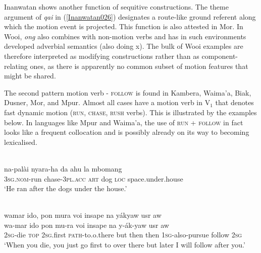 Inanwatan shows another function of sequitive constructions. The theme argument of \textit{qai} in (\ref{Inanwatan026}) designates a route-like ground referent along which the motion event is projected. This function is also attested in Mor. In Wooi, \textit{ong} also combines with non-motion verbs and has in such environments developed adverbial semantics (also doing x). The bulk of Wooi examples are therefore interpreted as modifying constructions rather than as component-relating ones, as there is apparently no common subset of motion features that might be shared.

The second pattern motion verb - \textsc{follow} is found in Kambera, Waima'a, Biak, Dusner, Mor, and Mpur. Almost all cases have a motion verb in V$_{1}$ that denotes fast dynamic motion (\textsc{run}, \textsc{chase}, \textsc{rush} verbs). This is illustrated by the examples below. In languages like Mpur and Waima'a, the use of \textsc{run} + \textsc{follow} in fact looks like a frequent collocation and is possibly already on its way to becoming lexicalised.

\ea \label{Kambera003}
\\
\gll na-palài nyara-ha da ahu la mbomang \\
\textsc{3}\textsc{sg}.\textsc{nom}-run chase-\textsc{3}\textsc{pl}.\textsc{acc} \textsc{art} dog \textsc{loc} space.under.house \\
\glft `He ran after the dogs under the house.' \\ 
\z

\ea \label{Biak005}
\\
\glll wamar ido, pon mura voi insape na yákyaw usr aw \\
wa-mar ido pon mu-ra voi insape na y-ák-yaw usr aw \\
\textsc{2}\textsc{sg}-die \textsc{top} \textsc{2}\textsc{sg}.first \textsc{path}-to.o.there but then then \textsc{1}\textsc{sg}-also-pursue follow \textsc{2}\textsc{sg} \\
\glft `When you die, you just go first to over there but later I will follow after you.'\\ 
\z

